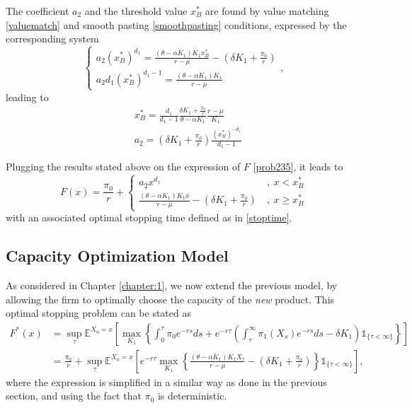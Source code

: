 The coefficient $a_2$ and the threshold value $x_B^*$ are found by value matching \eqref{valuematch} and smooth pasting \eqref{smoothpasting} conditions, expressed by the corresponding system
\begin{equation}
\begin{cases} a_2(x_B^*)^{d_1}=\frac{(\theta-\alpha K_1)K_1 x_B^*}{r-\mu} - \left( \delta K_1  +\frac{\pi_0}{r}\right) \\
a_2d_1(x_B^*)^{d_1-1}=\frac{(\theta-\alpha K_1)K_1}{r-\mu}
\end{cases},
\label{eq:sistema2}
\end{equation}
leading to
\begin{align}
&x_B^*=\frac{d_1}{d_1-1} \frac{ \delta K_1  +\frac{\pi_0}{r} }{\theta-\alpha K_1} \frac{r-\mu}{K_1} \label{2_xB} \\
&a_2=\left( \delta K_1 +\frac{\pi_0}{r}\right) \frac{(x_B^*)^{-d_1}}{d_1-1} \label{2_aB}
\end{align}


Plugging the results stated above on the expression of $F$ \eqref{prob235}, it leads to
\begin{equation}
F(x)=\frac{\pi_0}{r}+\begin{cases} a_2 x^{d_1} &\ , \ x<x^*_B \\
\frac{(\theta-\alpha K_1)K_1 x}{r-\mu} - \left( \delta K_1  +\frac{\pi_0}{r}\right) &\ , \ x\geq x_B^*
\label{2:Fbm}
\end{cases}
\end{equation}
with an associated optimal stopping time defined as in \eqref{stoptime}.




\subsection{Capacity Optimization Model}
\label{subsec:2_com}

As considered in Chapter \ref{chapter:1}, we now extend the previous model, by allowing the firm to optimally choose the capacity of the \textit{new} product.
This optimal stopping problem can be stated as
\begin{align}
F^*(x)&=\sup _\tau \mathds{E}^{X_0=x} \left[ \max_{K_1} \left\{ \int_0^\tau \pi_0e^{-rs} ds + e^{-r\tau} \left( \int_\tau^\infty \pi_1(X_s)e^{-rs}ds -\delta K_1 \right) \mathds{1}_{ \{\tau < \infty \} } \right\} \right] \nonumber \\
&= \frac{\pi_0}{r}+ \sup _\tau \mathds{E}^{X_0=x} \left[ e^{-r\tau} \max_{K_1}   \left\{ \frac{(\theta-\alpha K_1)K_1X_\tau}{r-\mu} - \left( \delta K_1  +\frac{\pi_0}{r}\right)   \right\} \mathds{1}_{ \{\tau < \infty \} } \right],
\label{eq:o2}
\end{align}
where the expression is simplified in a similar way as done in the previous section, and using the fact that $\pi_0$ is deterministic.


